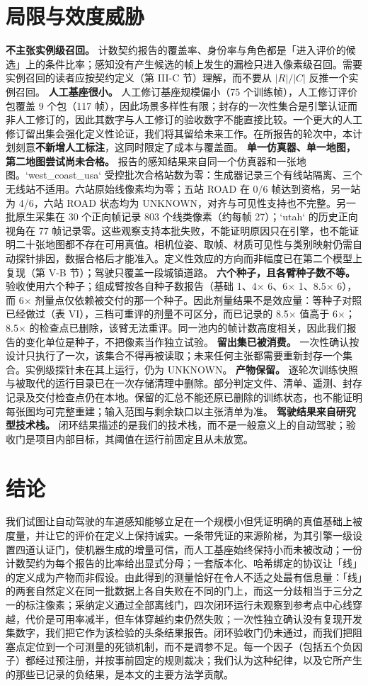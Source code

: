 \documentclass[journal]{IEEEtran}
\begin{document}
\section{局限与效度威胁}
\textbf{不主张实例级召回。} 计数契约报告的覆盖率、身份率与角色都是「进入评价的候选」上的条件比率；感知没有产生候选的帧上发生的漏检只进入像素级召回。需要实例召回的读者应按契约定义（第 III-C 节）理解，而不要从 $|R|/|C|$ 反推一个实例召回。
\textbf{人工基座很小。} 人工修订基座规模偏小（75 个训练帧），人工修订评价包覆盖 9 个包（117 帧），因此场景多样性有限；封存的一次性集合是引擎认证而非人工修订的，因此其数字与人工修订的验收数字不能直接比较。一个更大的人工修订留出集会强化定义性论证，我们将其留给未来工作。在所报告的轮次中，本计划刻意\textbf{不新增人工标注}，这同时限定了成本与覆盖面。
\textbf{单一仿真器、单一地图，第二地图尝试尚未合格。} 报告的感知结果来自同一个仿真器和一张地图。`west_coast_usa` 受控批次合格站数为零：生成器记录三个有线站隔离、三个无线站不适用。六站原始线像素均为零；五站 ROAD 在 0/6 帧达到资格，另一站为 4/6，六站 ROAD 状态均为 UNKNOWN，对齐与可见性支持也不完整。另一批原生采集在 30 个正向帧记录 803 个线类像素（约每帧 27）；`utah` 的历史正向视角在 77 帧记录零。这些观察支持本批失败，不能证明原因只在引擎，也不能证明二十张地图都不存在可用真值。相机位姿、取帧、材质可见性与类别映射仍需自动探针排因，数据合格后才能准入。定义性效应的方向而非幅度已在第二个模型上复现（第 V-B 节）；驾驶只覆盖一段城镇道路。
\textbf{六个种子，且各臂种子数不等。} 验收使用六个种子；组成臂按各自种子数报告（基础 1、4$\times$ 6、6$\times$ 1、8.5$\times$ 6），而 6$\times$ 剂量点仅依赖被交付的那一个种子。因此剂量结果不是效应量：等种子对照已经做过（表 VI），三档可重评的剂量不可区分，而已记录的 8.5$\times$ 值高于 6$\times$；8.5$\times$ 的检查点已删除，该臂无法重评。同一池内的帧计数高度相关，因此我们报告的变化单位是种子，不把像素当作独立试验。
\textbf{留出集已被消费。} 一次性确认按设计只执行了一次，该集合不得再被读取；未来任何主张都需要重新封存一个集合。实例级探针未在其上运行，仍为 UNKNOWN。
\textbf{产物保留。} 逐轮次训练快照与被取代的运行目录已在一次存储清理中删除。部分判定文件、清单、遥测、封存记录及交付检查点仍在本地。保留的汇总不能还原已删除的训练状态，也不能证明每张图均可完整重建；输入范围与剩余缺口以主张清单为准。
\textbf{驾驶结果来自研究型技术栈。} 闭环结果描述的是我们的技术栈，而不是一般意义上的自动驾驶；验收门是项目内部目标，其阈值在运行前固定且从未放宽。
\section{结论}
我们试图让自动驾驶的车道感知能够立足在一个规模小但凭证明确的真值基础上被度量，并让它的评价在定义上保持诚实。一条带凭证的来源阶梯，为其引擎一级设置四道认证门，使机器生成的增量可信，而人工基座始终保持小而未被改动；一份计数契约为每个报告的比率给出显式分母；一套版本化、哈希绑定的协议让「线」的定义成为产物而非假设。由此得到的测量恰好在令人不适之处最有信息量：「线」的两套自然定义在同一批数据上各自失败在不同的门上，而这一分歧相当于三分之一的标注像素；采纳定义通过全部离线门，四次闭环运行未观察到参考点中心线穿越，代价是可用率减半，但车体穿越约束仍然失败；一次性独立确认没有复现开发集数字，我们把它作为该检验的头条结果报告。闭环验收门仍未通过，而我们把阻塞点定位到一个可测量的死锁机制，而不是调参不足。每一个因子（包括五个负因子）都经过预注册，并按事前固定的规则裁决；我们认为这种纪律，以及它所产生的那些已记录的负结果，是本文的主要方法学贡献。
\end{document}
